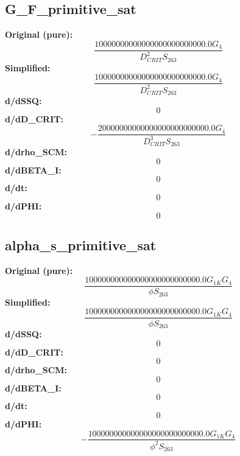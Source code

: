 \subsection{G_F_primitive_sat}
\textbf{Original (pure):}
\begin{equation}
\frac{10000000000000000000000000.0 G_{4}}{D_{CRIT}^{2} S_{26 3}}
\end{equation}
\textbf{Simplified:}
\begin{equation}
\frac{10000000000000000000000000.0 G_{4}}{D_{CRIT}^{2} S_{26 3}}
\end{equation}
\textbf{d/dSSQ:}
\begin{equation}
0
\end{equation}
\textbf{d/dD_CRIT:}
\begin{equation}
- \frac{20000000000000000000000000.0 G_{4}}{D_{CRIT}^{3} S_{26 3}}
\end{equation}
\textbf{d/drho_SCM:}
\begin{equation}
0
\end{equation}
\textbf{d/dBETA_I:}
\begin{equation}
0
\end{equation}
\textbf{d/dt:}
\begin{equation}
0
\end{equation}
\textbf{d/dPHI:}
\begin{equation}
0
\end{equation}

\subsection{alpha_s_primitive_sat}
\textbf{Original (pure):}
\begin{equation}
\frac{100000000000000000000000000.0 G_{1 K} G_{4}}{\phi S_{26 3}}
\end{equation}
\textbf{Simplified:}
\begin{equation}
\frac{100000000000000000000000000.0 G_{1 K} G_{4}}{\phi S_{26 3}}
\end{equation}
\textbf{d/dSSQ:}
\begin{equation}
0
\end{equation}
\textbf{d/dD_CRIT:}
\begin{equation}
0
\end{equation}
\textbf{d/drho_SCM:}
\begin{equation}
0
\end{equation}
\textbf{d/dBETA_I:}
\begin{equation}
0
\end{equation}
\textbf{d/dt:}
\begin{equation}
0
\end{equation}
\textbf{d/dPHI:}
\begin{equation}
- \frac{100000000000000000000000000.0 G_{1 K} G_{4}}{\phi^{2} S_{26 3}}
\end{equation}

